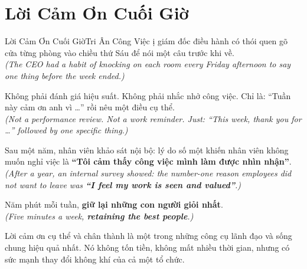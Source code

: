 \section{Lời Cảm Ơn Cuối Giờ}
\begin{truyen}{Lời Cảm Ơn Cuối Giờ}{Tri Ân Công Việc}
ị giám đốc điều hành có thói quen gõ cửa từng phòng vào chiều thứ Sáu để nói một câu trước khi về.\\
\textit{(The CEO had a habit of knocking on each room every Friday afternoon to say one thing before the week ended.)}

Không phải đánh giá hiệu suất. Không phải nhắc nhở công việc. Chỉ là: ``Tuần này cảm ơn anh vì \dots'' rồi nêu một điều cụ thể.\\
\textit{(Not a performance review. Not a work reminder. Just: ``This week, thank you for \dots'' followed by one specific thing.)}

Sau một năm, nhân viên khảo sát nội bộ: lý do số một khiến nhân viên không muốn nghỉ việc là \textbf{``Tôi cảm thấy công việc mình làm được nhìn nhận''}.\\
\textit{(After a year, an internal survey showed: the number-one reason employees did not want to leave was \textbf{``I feel my work is seen and valued''}.)}

Năm phút mỗi tuần, \textbf{giữ lại những con người giỏi nhất}.\\
\textit{(Five minutes a week, \textbf{retaining the best people}.)}
\end{truyen}
\begin{baihoc}
  Lời cảm ơn cụ thể và chân thành là một trong những công cụ lãnh đạo và sống chung hiệu quả nhất. Nó không tốn tiền, không mất nhiều thời gian, nhưng có sức mạnh thay đổi không khí của cả một tổ chức.
\end{baihoc}
